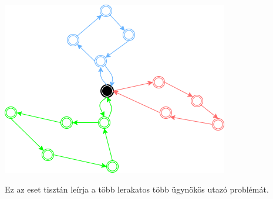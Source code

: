 \includegraphics[scale=0.7]{images/Onedepotmtsp.png}


Ez az eset tisztán leírja a több lerakatos több ügynökös utazó problémát. 